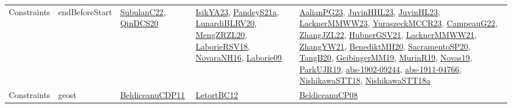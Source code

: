 {\begin{longtable}{lp{3cm}>{\raggedright}p{6cm}>{\raggedright}p{6cm}p{8cm}}
Constraints & endBeforeStart & \href{articles/SubulanC22.pdf}{SubulanC22}\cite{SubulanC22}, \href{articles/QinDCS20.pdf}{QinDCS20}\cite{QinDCS20} & \href{articles/IsikYA23.pdf}{IsikYA23}\cite{IsikYA23}, \href{articles/PandeyS21a.pdf}{PandeyS21a}\cite{PandeyS21a}, \href{articles/LunardiBLRV20.pdf}{LunardiBLRV20}\cite{LunardiBLRV20}, \href{articles/MengZRZL20.pdf}{MengZRZL20}\cite{MengZRZL20}, \href{articles/LaborieRSV18.pdf}{LaborieRSV18}\cite{LaborieRSV18}, \href{articles/NovaraNH16.pdf}{NovaraNH16}\cite{NovaraNH16}, \href{papers/Laborie09.pdf}{Laborie09}\cite{Laborie09} & \href{papers/AalianPG23.pdf}{AalianPG23}\cite{AalianPG23}, \href{papers/JuvinHHL23.pdf}{JuvinHHL23}\cite{JuvinHHL23}, \href{papers/JuvinHL23.pdf}{JuvinHL23}\cite{JuvinHL23}, \href{articles/LacknerMMWW23.pdf}{LacknerMMWW23}\cite{LacknerMMWW23}, \href{articles/YuraszeckMCCR23.pdf}{YuraszeckMCCR23}\cite{YuraszeckMCCR23}, \href{articles/CampeauG22.pdf}{CampeauG22}\cite{CampeauG22}, \href{papers/ZhangJZL22.pdf}{ZhangJZL22}\cite{ZhangJZL22}, \href{articles/HubnerGSV21.pdf}{HubnerGSV21}\cite{HubnerGSV21}, \href{papers/LacknerMMWW21.pdf}{LacknerMMWW21}\cite{LacknerMMWW21}, \href{articles/ZhangYW21.pdf}{ZhangYW21}\cite{ZhangYW21}, \href{articles/BenediktMH20.pdf}{BenediktMH20}\cite{BenediktMH20}, \href{articles/SacramentoSP20.pdf}{SacramentoSP20}\cite{SacramentoSP20}, \href{papers/TangB20.pdf}{TangB20}\cite{TangB20}, \href{papers/GeibingerMM19.pdf}{GeibingerMM19}\cite{GeibingerMM19}, \href{papers/MurinR19.pdf}{MurinR19}\cite{MurinR19}, \href{articles/Novas19.pdf}{Novas19}\cite{Novas19}, \href{papers/ParkUJR19.pdf}{ParkUJR19}\cite{ParkUJR19}, \href{articles/abs-1902-09244.pdf}{abs-1902-09244}\cite{abs-1902-09244}, \href{articles/abs-1911-04766.pdf}{abs-1911-04766}\cite{abs-1911-04766}, \href{papers/NishikawaSTT18.pdf}{NishikawaSTT18}\cite{NishikawaSTT18}, \href{papers/NishikawaSTT18a.pdf}{NishikawaSTT18a}\cite{NishikawaSTT18a}\\
Constraints & geost & \href{articles/BeldiceanuCDP11.pdf}{BeldiceanuCDP11}\cite{BeldiceanuCDP11} & \href{papers/LetortBC12.pdf}{LetortBC12}\cite{LetortBC12} & \href{papers/BeldiceanuCP08.pdf}{BeldiceanuCP08}\cite{BeldiceanuCP08}\\

\end{longtable}}
